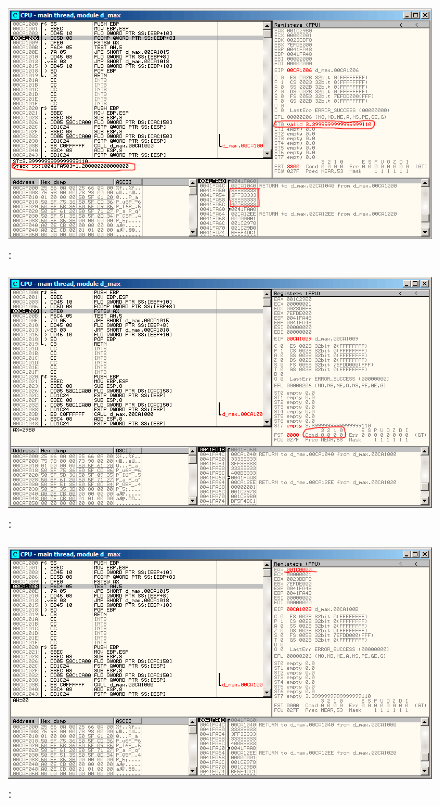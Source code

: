 \begin{figure}[H]
\centering
\includegraphics[scale=\FigScale]{patterns/12_FPU/3_comparison/x86/MSVC/olly1_1.png}
\caption{\olly: }
\label{fig:FPU_comparison_case1_olly1}
\end{figure}

\begin{figure}[H]
\centering
\includegraphics[scale=\FigScale]{patterns/12_FPU/3_comparison/x86/MSVC/olly1_2.png}
\caption{\olly: \FCOMP {}}
\label{fig:FPU_comparison_case1_olly2}
\end{figure}

\begin{figure}[H]
\centering
\includegraphics[scale=\FigScale]{patterns/12_FPU/3_comparison/x86/MSVC/olly1_3.png}
\caption{\olly: \FNSTSW {}}
\label{fig:FPU_comparison_case1_olly3}
\end{figure}

